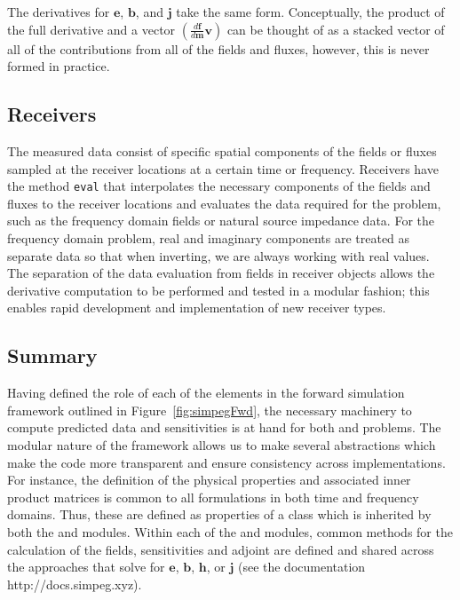 The derivatives for $\mathbf{e}$, $\mathbf{b}$, and $\mathbf{j}$ take the same
form. Conceptually, the product of the full derivative and a vector
$\left(\frac{d\mathbf{f}}{d\mathbf{m}} \mathbf{v}\right)$ can be thought of as a stacked
vector of all of the contributions from all of the fields and fluxes, however,
this is never formed in practice.



\subsection{Receivers}
\label{sec:Receivers}

The measured data consist of specific spatial components of the fields or
fluxes sampled at the receiver locations at a certain time or frequency.
Receivers have the method \texttt{eval} that interpolates the necessary
components of the fields and fluxes to the receiver locations and evaluates
the data required for the problem, such as the frequency domain fields or
natural source impedance data. For the frequency domain problem, real and
imaginary components are treated as separate data so that when inverting, we
are always working with real values. The separation of the data evaluation
from fields in receiver objects allows the derivative computation to be
performed and tested in a modular fashion; this enables rapid development and
implementation of new receiver types.



\subsection{Summary}
\label{sec:Summary}

Having defined the role of each of the elements in the forward simulation
framework outlined in Figure~\ref{fig:simpegFwd}, the necessary machinery to
compute predicted data and sensitivities is at hand for both \FDEM and \TDEM
problems. The modular nature of the framework allows us to make several
abstractions which make the code more transparent and ensure consistency
across implementations. For instance, the definition of the physical
properties and associated inner product matrices is common to all formulations
in both time and frequency domains. Thus, these are defined as properties of a
\BaseEM class which is inherited by both the \TDEM and \FDEM modules. Within
each of the \TDEM and \FDEM modules, common methods for the calculation of the
fields, sensitivities and adjoint are defined and shared across the approaches
that solve for $\mathbf{e}$, $\mathbf{b}$, $\mathbf{h}$, or $\mathbf{j}$ (see
the documentation http://docs.simpeg.xyz).

